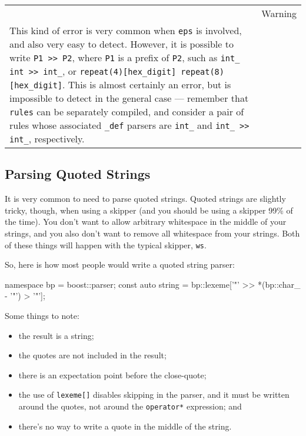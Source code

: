 \begin{longtable}[]{@{}
  >{\raggedright\arraybackslash}p{}
  >{\raggedright\arraybackslash}p{}@{}}
\toprule\noalign{}
\endhead
\bottomrule\noalign{}
\endlastfoot
\begin{minipage}[t]{\linewidth}\raggedright
\end{minipage} & Warning \\
This kind of error is very common when \texttt{eps} is involved, and also very easy to detect. However, it is possible to write \texttt{P1 >> P2}, where \texttt{P1} is a prefix of \texttt{P2}, such as \texttt{int\_ \textbar{} int >> int\_}, or \texttt{repeat(4){[}hex\_digit{]} \textbar{} repeat(8){[}hex\_digit{]}}. This is almost certainly an error, but is impossible to detect in the general case --- remember that \texttt{rules} can be separately compiled, and consider a pair of rules whose associated \texttt{\_def} parsers are \texttt{int\_} and \texttt{int\_ >> int\_}, respectively. & \\
\end{longtable}

\subsection{Parsing Quoted Strings}

It is very common to need to parse quoted strings. Quoted strings are slightly tricky, though, when using a skipper (and you should be using a skipper 99\% of the time). You don't want to allow arbitrary whitespace in the middle of your strings, and you also don't want to remove all whitespace from your strings. Both of these things will happen with the typical skipper, \texttt{ws}.

So, here is how most people would write a quoted string parser:

\begin{code}
namespace bp = boost::parser;
const auto string = bp::lexeme['"' >> *(bp::char_ - '"') > '"'];
\end{code}

Some things to note:

\begin{itemize}
\item
  the result is a string;
\item
  the quotes are not included in the result;
\item
  there is an expectation point before the close-quote;
\item
  the use of \texttt{lexeme{[}{]}} disables skipping in the parser, and it must be written around the quotes, not around the \texttt{operator*} expression; and
\item
  there's no way to write a quote in the middle of the string.
\end{itemize}

